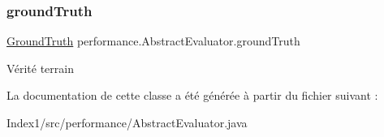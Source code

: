 \subsubsection{\texorpdfstring{ground\+Truth}{groundTruth}}
{\footnotesize\ttfamily \hyperlink{classperformance_1_1GroundTruth}{Ground\+Truth} performance.\+Abstract\+Evaluator.\+ground\+Truth\hspace{0.3cm}{\ttfamily [protected]}}

Vérité terrain 

La documentation de cette classe a été générée à partir du fichier suivant \+:\begin{DoxyCompactItemize}
\item 
Index1/src/performance/Abstract\+Evaluator.\+java\end{DoxyCompactItemize}

